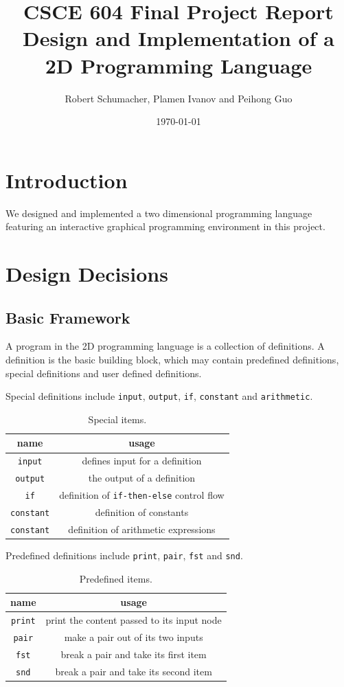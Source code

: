 \documentclass[12pt,UTF8,a4]{article}
\title{CSCE 604 Final Project Report \\ Design and Implementation of a 2D Programming Language}
\author{Robert Schumacher, Plamen Ivanov and Peihong Guo}
\date{\today}
\begin{document}
\maketitle
\singlespacing

\section{Introduction}
We designed and implemented a two dimensional programming language featuring an interactive graphical programming environment in this project.

\section{Design Decisions}
\subsection{Basic Framework}
A program in the 2D programming language is a collection of definitions. A definition is the basic building block, which may contain predefined definitions, special definitions and user defined definitions.

Special definitions include \texttt{input}, \texttt{output}, \texttt{if}, \texttt{constant} and \texttt{arithmetic}.
\begin{table}[h]
\center
\begin{tabular}{c|c}
\hline
name & usage \\
\hline
\texttt{input} & defines input for a definition\\
\texttt{output} & the output of a definition\\
\texttt{if} & definition of \texttt{if-then-else} control flow \\
\texttt{constant} & definition of constants \\
\texttt{constant} & definition of arithmetic expressions \\
\hline
\end{tabular}
\caption{Special items.}\label{tab:sitems}
\end{table}

Predefined definitions include \texttt{print}, \texttt{pair}, \texttt{fst} and \texttt{snd}.
\begin{table}[h]
\center
\begin{tabular}{c|c}
\hline
name & usage \\
\hline
\texttt{print} & print the content passed to its input node\\
\texttt{pair} & make a pair out of its two inputs\\
\texttt{fst} & break a pair and take its first item \\
\texttt{snd} & break a pair and take its second item \\
\hline
\end{tabular}
\caption{Predefined items.}\label{tab:pitems}
\end{table}
\end{document}
